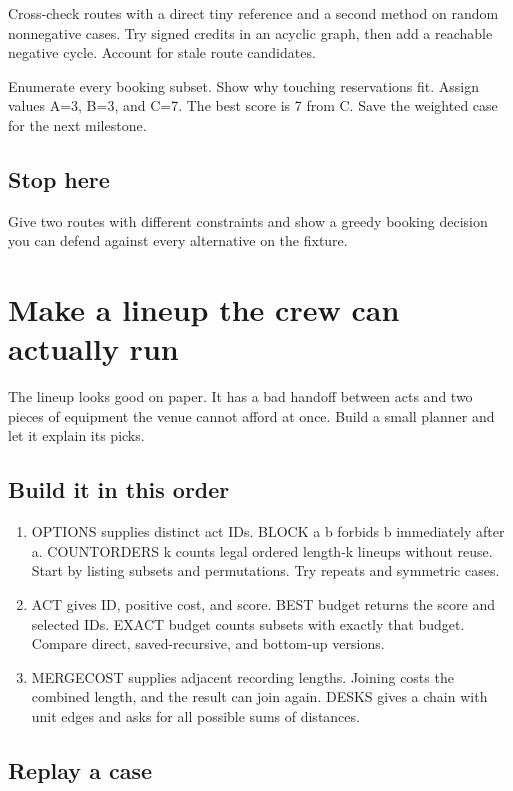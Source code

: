\documentclass[11pt,letterpaper]{article}
\begin{document}
Cross-check routes with a direct tiny reference and a second method on random nonnegative cases. Try signed credits in an acyclic graph, then add a reachable negative cycle. Account for stale route candidates.

Enumerate every booking subset. Show why touching reservations fit. Assign values A=3, B=3, and C=7. The best score is 7 from C. Save the weighted case for the next milestone.

\subsection*{Stop here}

Give two routes with different constraints and show a greedy booking decision you can defend against every alternative on the fixture.

\clearpage

\section{Make a lineup the crew can actually run}\label{festival:06}

The lineup looks good on paper. It has a bad handoff between acts and two pieces of equipment the venue cannot afford at once. Build a small planner and let it explain its picks.

\subsection*{Build it in this order}

\begin{enumerate}
\item OPTIONS supplies distinct act IDs. BLOCK a b forbids b immediately after a. COUNTORDERS k counts legal ordered length-k lineups without reuse. Start by listing subsets and permutations. Try repeats and symmetric cases.
\item ACT gives ID, positive cost, and score. BEST budget returns the score and selected IDs. EXACT budget counts subsets with exactly that budget. Compare direct, saved-recursive, and bottom-up versions.
\item MERGECOST supplies adjacent recording lengths. Joining costs the combined length, and the result can join again. DESKS gives a chain with unit edges and asks for all possible sums of distances.
\end{enumerate}

\subsection*{Replay a case}
\end{document}
